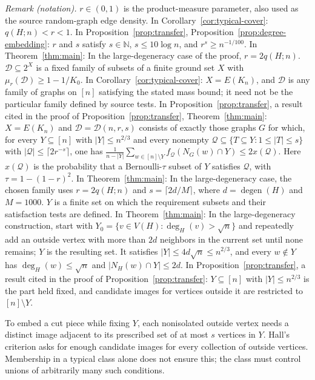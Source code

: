 \documentclass[11pt]{article}
\theoremstyle{remark}
\numberwithin{equation}{section}
\newcommand{\calD}{\mathcal D}
\newcommand{\calQ}{\mathcal Q}
\DeclareMathOperator{\degen}{degen}
\begin{document}
\noindent\textit{Remark (notation).} $r\in(0,1)$ is the product-measure parameter, also used as the source random-graph edge density. In Corollary~\ref{cor:typical-cover}: $q(H;n)<r<1$. In Proposition~\ref{prop:transfer}, Proposition~\ref{prop:degree-embedding}: $r$ and $s$ satisfy $s\in\mathbb N$, $s\leq10\log n$, and $r^s\geq n^{-1/100}$. In Theorem~\ref{thm:main}: In the large-degeneracy case of the proof, $r=2q(H;n)$. $\calD\subseteq2^X$ is a fixed family of subsets of a finite ground set $X$ with $\mu_r(\calD)\geq1-1/K_0$. In Corollary~\ref{cor:typical-cover}: $X=E(K_n)$, and $\calD$ is any family of graphs on $[n]$ satisfying the stated mass bound; it need not be the particular family defined by source tests. In Proposition~\ref{prop:transfer}, a result cited in the proof of Proposition~\ref{prop:transfer}, Theorem~\ref{thm:main}: $X=E(K_n)$ and $\calD=\calD(n,r,s)$ consists of exactly those graphs $G$ for which, for every $Y\subseteq[n]$ with $|Y|\leq n^{2/3}$ and every nonempty $\calQ\subseteq\{T\subseteq Y:1\leq|T|\leq s\}$ with $|\calQ|\leq\lceil2r^{-s}\rceil$, one has $\frac{1}{n-|Y|}\sum_{w\in[n]\setminus Y}f_{\calQ}(N_G(w)\cap Y)\leq2x(\calQ)$. Here $x(\calQ)$ is the probability that a Bernoulli-$\tau$ subset of $Y$ satisfies $\calQ$, with $\tau=1-(1-r)^2$. In Theorem~\ref{thm:main}: In the large-degeneracy case, the chosen family uses $r=2q(H;n)$ and $s=\lceil2d/M\rceil$, where $d=\degen(H)$ and $M=1000$. $Y$ is a finite set on which the requirement subsets and their satisfaction tests are defined. In Theorem~\ref{thm:main}: In the large-degeneracy construction, start with $Y_0=\{v\in V(H):\deg_H(v)>\sqrt n\}$ and repeatedly add an outside vertex with more than $2d$ neighbors in the current set until none remains; $Y$ is the resulting set. It satisfies $|Y|\leq4d\sqrt n\leq n^{2/3}$, and every $w\notin Y$ has $\deg_H(w)\leq\sqrt n$ and $|N_H(w)\cap Y|\leq2d$. In Proposition~\ref{prop:transfer}, a result cited in the proof of Proposition~\ref{prop:transfer}: $Y\subseteq[n]$ with $|Y|\leq n^{2/3}$ is the part held fixed, and candidate images for vertices outside it are restricted to $[n]\setminus Y$.


To embed a cut piece while fixing $Y$, each nonisolated outside
vertex needs a distinct image adjacent to its prescribed set of
at most $s$ vertices in $Y$. Hall's criterion asks for enough
candidate images for every collection of outside vertices.
Membership in a typical class alone does not ensure this; the
class must control unions of arbitrarily many such conditions.
\end{document}

